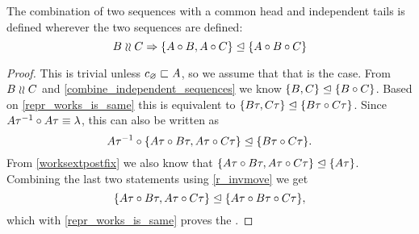 \begin{mylem}\label{indep_prefix_combine}
The combination of two sequences with a common head and independent tails 
is defined wherever the two sequences are defined:
\[ B\mathrel{\wr\wr} C \Rightarrow {\{{A\circ B, A\circ C}\}}\trianglelefteq{\{{A\circ B\circ C}\}} \]
\end{mylem}
\begin{proof}
This is trivial unless $c_\varnothing\sqsubset{A}$, so we assume that that is the case.
From $B\mathrel{\wr\wr} C$ and \cref{combine_independent_sequences} we know
${\{{B, C}\}}\trianglelefteq{\{{B\circ C}\}}$.
Based on \cref{repr_works_is_same} this is equivalent to
${\{{B\tau, C\tau}\}}\trianglelefteq{\{{B\tau\circ C\tau}\}}$.
Since $A\tau^{-1}\circ A\tau \equiv \lambda$, this can also be written as
\[{A\tau^{-1}\circ\{A\tau\circ B\tau, A\tau\circ C\tau\}}\trianglelefteq{\{{B\tau\circ C\tau}\}}.\]
From \cref{worksextpostfix} we also know that
${\{{A\tau\circ B\tau, A\tau\circ C\tau}\}}\trianglelefteq{\{{A\tau}\}}$.
Combining the last two statements using \cref{r_invmove}
we get
\[ {\{{A\tau\circ B\tau, A\tau\circ C\tau}\}}\trianglelefteq{\{{A\tau\circ B\tau\circ C\tau}\}}, \]
which with \cref{repr_works_is_same} proves the
.
\end{proof}
